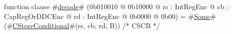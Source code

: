 function clause #\hyperref[zdecode]{decode}# (0b010010 @ 0b10000 @ rs : IntRegEnc @ cb : CapRegOrDDCEnc @ rd : IntRegEnc @ 0b0000 @ 0b00) = #\hyperref[zSome]{Some}#(#\hyperref[zCStoreConditional]{CStoreConditional}#(rs, cb, rd, B)) /* CSCB */

